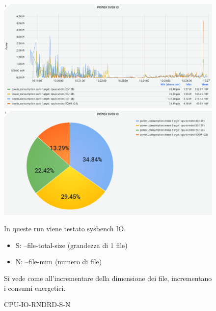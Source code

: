 \documentclass[10pt,a4paper]{article}
\begin{document}
\begin{figure}[h]
\caption{CPU-IO-RNDRD-S-N}
\centering
\includegraphics[scale=0.4]{image33}
\includegraphics[scale=0.4]{image36}
\begin{flushleft}
In queste run viene testato sysbench IO.
\begin{itemize}
\item S: --file-total-size (grandezza di 1 file)
\item N: --file-num (numero di file)
\end{itemize}
\end{flushleft}
\begin{flushleft}
Si vede come all'incrementare della dimensione dei file, incrementano i consumi energetici.
\end{flushleft}
\end{figure}
\end{document}
